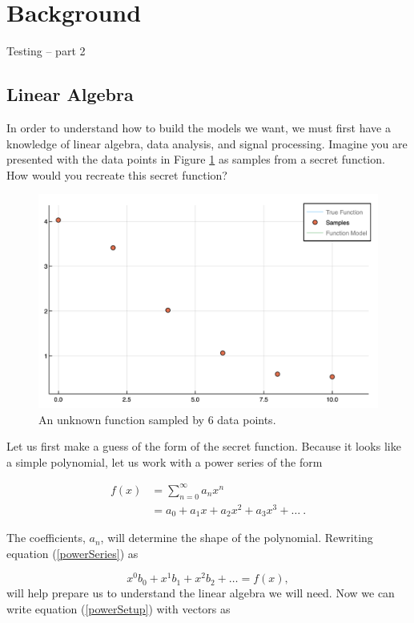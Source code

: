 \section{Background}\label{Sect:background}
Testing -- part 2
\subsection{Linear Algebra}\label{Sect:linearAlgebra}
In order to understand how to build the models we want, we must first have a knowledge of linear algebra, data analysis, and signal processing. Imagine you are presented with the data points in Figure \ref{figFunc1Samples} as samples from a secret function. How would you recreate this secret function?

\begin{figure}[h]
\includegraphics[scale = 0.4]{Figures/func1Samples}
\caption{An unknown function sampled by 6 data points.
\label{figFunc1Samples}} 
\end{figure}

\par Let us first make a guess of the form of the secret function. Because it looks like a simple polynomial, let us work with a power series of the form

\begin{align}
f(x) &= \sum_{n=0}^\infty a_n x^n
	\label{powerSum}\\ 
&= a_0 + a_1x + a_2x^2 + a_3x^3 +\ldots \ .
	\label{powerSeries}
\end{align}

\par The coefficients, $a_n$, will determine the shape of the polynomial. Rewriting equation (\ref{powerSeries}) as

\begin{equation} \label{powerSetup}
x^0b_0 + x^1b_1 + x^2b_2 + \ldots = f(x),
\end{equation}
will help prepare us to understand the linear algebra we will need. Now we can write equation (\ref{powerSetup}) with vectors as

